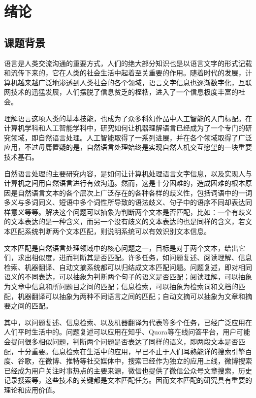 \chapter{绪论}

\section{课题背景}

语言是人类交流沟通的重要方式，人们的绝大部分知识也是以语言文字的形式记载和流传下来的，它在人类的社会生活中起着至关重要的作用。随着时代的发展，计算机越来越广泛地渗透到人类社会的各个领域，语言文字信息也逐渐数字化，互联网技术的迅猛发展，人们摆脱了信息贫乏的桎梏，进入了一个信息极度丰富的社会。

理解语言这项人类的基本技能，也成为了众多科幻作品中人工智能的入门标配。在计算机学科和人工智能学科中，研究如何让机器理解语言已经成为了一个专门的研究领域，即自然语言处理。人工智能取得了一系列进展，并在各个领域取得了广泛应用，不过毋庸置疑的是，自然语言处理始终是实现自然人机交互愿望的一块重要技术基石。

自然语言处理的主要研究内容，是如何让计算机处理语言文字信息，以及实现人与计算机之间用自然语言进行有效沟通。然而，这是十分困难的，造成困难的根本原因是自然语言文本的各个层次上广泛存在的各种各样的歧义性，包括词语中的一词多义与多词同义、短语中多个词性所导致的语法歧义、句子中的语序不同却表达同样意义等等。解决这个问题可以抽象为判断两个文本是否匹配，比如：一个有歧义的文本表达的是一种含义，而另一个没有歧义的文本表达的也是同样的含义，若文本匹配系统判断两个文本匹配，则说明系统可以有效识别文本信息。

文本匹配是自然语言处理领域中的核心问题之一，目标是对于两个文本，给出它们，求出相似度，进而判断其是否匹配。许多任务，如问题复述、阅读理解、信息检索、机器翻译、自动文摘系统都可以归结成文本匹配问题。问题复述，即对相同语义的不同表达，可以抽象为判断两个句子的语义是否匹配；阅读理解，可以抽象为文章中信息和所问题目之间的匹配；信息检索，可以抽象为检索词和文档的匹配，机器翻译可以抽象为两种不同语言之间的匹配；自动文摘可以抽象为文章和摘要之间的匹配。

其中，以问题复述、信息检索、以及机器翻译为代表等多个任务，已经广泛应用在人们平时生活中的。问题复述可以应用在知乎、Quora等在线问答平台，用户可能会提问很多相似问题，判断两个问题是否表达了同样的语义，即两段文本是否匹配，十分重要。信息检索在生活中的应用，早已不止于人们耳熟能详的搜索引擎百度、谷歌，在微博、推特等社交媒体中，搜索已经作为独立的应用上线，微博搜索已经成为用户关注时事热点的主要来源，微信也提供了微信公众号文章搜索，历史记录搜索等，这些技术的关键都是文本匹配任务。因而文本匹配的研究具有重要的理论和应用价值。

